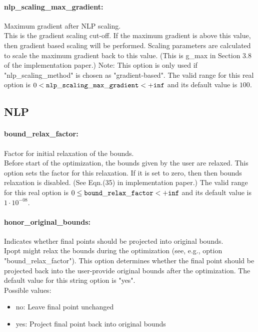 \paragraph{nlp\_scaling\_max\_gradient:}\label{sec:nlp_scaling_max_gradient} Maximum gradient after NLP scaling. $\;$ \\
 This is the gradient scaling cut-off. If the
maximum gradient is above this value, then
gradient based scaling will be performed. Scaling
parameters are calculated to scale the maximum
gradient back to this value. (This is g\_max in
Section 3.8 of the implementation paper.) Note:
This option is only used if
"nlp\_scaling\_method" is chosen as
"gradient-based". The valid range for this real option is 
$0 <  {\tt nlp\_scaling\_max\_gradient } <  {\tt +inf}$
and its default value is $100$.


\subsection{NLP}

\paragraph{bound\_relax\_factor:}\label{sec:bound_relax_factor} Factor for initial relaxation of the bounds. $\;$ \\
 Before start of the optimization, the bounds
given by the user are relaxed.  This option sets
the factor for this relaxation.  If it is set to
zero, then then bounds relaxation is disabled.
(See Eqn.(35) in implementation paper.) The valid range for this real option is 
$0 \le {\tt bound\_relax\_factor } <  {\tt +inf}$
and its default value is $1 \cdot 10^{-08}$.


\paragraph{honor\_original\_bounds:}\label{sec:honor_original_bounds} Indicates whether final points should be projected into original bounds. $\;$ \\
 Ipopt might relax the bounds during the
optimization (see, e.g., option
"bound\_relax\_factor").  This option determines
whether the final point should be projected back
into the user-provide original bounds after the
optimization.
The default value for this string option is "yes".
\\ 
Possible values:
\begin{itemize}
   \item no: Leave final point unchanged
   \item yes: Project final point back into original bounds
\end{itemize}

